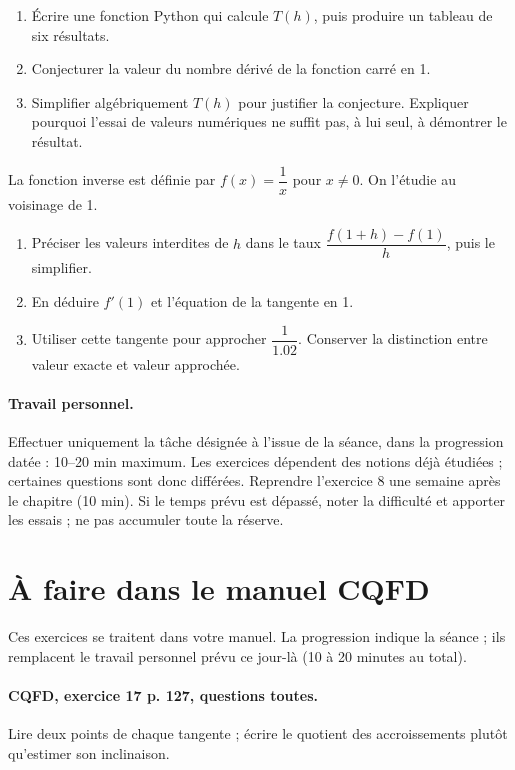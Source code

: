 \begin{enumerate}[label=\arabic*.]
\item Écrire une fonction Python qui calcule $T(h)$, puis produire un tableau de six résultats.
\item Conjecturer la valeur du nombre dérivé de la fonction carré en 1.
\item Simplifier algébriquement $T(h)$ pour justifier la conjecture. Expliquer pourquoi l’essai de valeurs numériques ne suffit pas, à lui seul, à démontrer le résultat.
\end{enumerate}
La fonction inverse est définie par $f(x)=\dfrac1x$ pour $x\ne0$. On l’étudie au voisinage de 1.
\begin{enumerate}[label=\arabic*.]
\item Préciser les valeurs interdites de $h$ dans le taux $\dfrac{f(1+h)-f(1)}h$, puis le simplifier.
\item En déduire $f\prime(1)$ et l’équation de la tangente en 1.
\item Utiliser cette tangente pour approcher $\dfrac1{\num{1,02}}$. Conserver la distinction entre valeur exacte et valeur approchée.
\end{enumerate}
\paragraph{Travail personnel.} Effectuer uniquement la tâche désignée à l’issue de la séance, dans la progression datée : 10–20 min maximum. Les exercices dépendent des notions déjà étudiées ; certaines questions sont donc différées. Reprendre l’exercice 8 une semaine après le chapitre (10 min). Si le temps prévu est dépassé, noter la difficulté et apporter les essais ; ne pas accumuler toute la réserve.
\endgroup
{}\section*{À faire dans le manuel CQFD}
Ces exercices se traitent dans votre manuel. La progression indique la séance ; ils remplacent le travail personnel prévu ce jour-là (10 à 20 minutes au total).
\paragraph{CQFD, exercice 17 p. 127, questions toutes.}\label{C04-M1} Lire deux points de chaque tangente ; écrire le quotient des accroissements plutôt qu’estimer son inclinaison.
